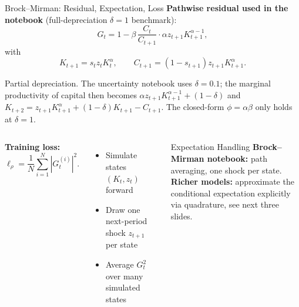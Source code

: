 \documentclass[aspectratio=169,11pt]{beamer}
\newcommand{\emphc}[1]{\textcolor{harvardcrimson}{#1}}
\begin{document}
\begin{frame}[shrink=10]{Brock--Mirman: Residual, Expectation, Loss}
\textbf{Pathwise residual used in the notebook} (full-depreciation $\delta=1$ benchmark):
\[
G_t = 1 - \beta \, \frac{C_t}{C_{t+1}} \cdot \alpha z_{t+1} K_{t+1}^{\alpha-1},
\]
with
\[
K_{t+1} = s_t z_t K_t^\alpha, \qquad
C_{t+1} = (1-s_{t+1}) z_{t+1} K_{t+1}^\alpha.
\]

\vspace{-0.2em}
{\scriptsize\emphc{Partial depreciation.}  The uncertainty notebook uses $\delta=0.1$; the marginal productivity of capital then becomes $\alpha z_{t+1} K_{t+1}^{\alpha-1} + (1-\delta)$ and $K_{t+2} = z_{t+1} K_{t+1}^{\alpha} + (1-\delta) K_{t+1} - C_{t+1}$.  The closed-form $\phi = \alpha\beta$ only holds at $\delta=1$.}

\vspace{0.3em}
\begin{columns}[T]
\textbf{Training loss:}
\[
\ell_\rho = \frac{1}{N}\sum_{i=1}^{N} |G_t^{(i)}|^2.
\]

\begin{itemize}
    \setlength{\itemsep}{1pt}
    \item Simulate states $(K_t,z_t)$ forward
    \item Draw one next-period shock $z_{t+1}$ per state
    \item Average $G_t^2$ over many simulated states
\end{itemize}

\begin{block}{Expectation Handling}
\small
\textbf{Brock--Mirman notebook:} path averaging, one shock per state.\\[2pt]
\textbf{Richer models:} approximate the conditional expectation explicitly via \emphc{quadrature}, see next three slides.
\end{block}
\end{columns}
\end{frame}

\end{document}
